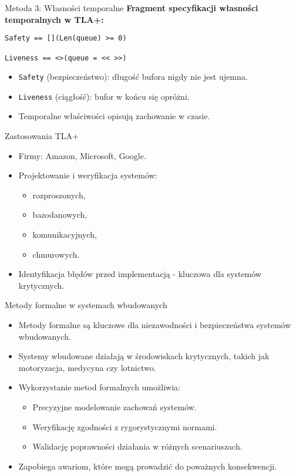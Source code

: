 \documentclass{beamer}
\begin{document}
\begin{frame}[fragile]{Metoda 3: Własności temporalne}
  \textbf{Fragment specyfikacji własności temporalnych w TLA+:}
  \vspace{0.5em}
  \begin{verbatim}
Safety == [](Len(queue) >= 0)

Liveness == <>(queue = << >>)
  \end{verbatim}

  \vspace{0.1em}
  \begin{itemize}
    \item \texttt{Safety} (bezpieczeństwo): długość bufora nigdy nie jest ujemna.
    \item \texttt{Liveness} (ciągłość): bufor w końcu się opróżni.
    \item Temporalne właściwości opisują zachowanie w czasie.
  \end{itemize}
\end{frame}

\begin{frame}{Zastosowania TLA+}
  \begin{itemize}
      \item Firmy: Amazon, Microsoft, Google.
      \item Projektowanie i weryfikacja systemów:
      \begin{itemize}
          \item rozproszonych,
          \item bazodanowych,
          \item komunikacyjnych,
          \item chmurowych.
      \end{itemize}
      \item Identyfikacja błędów przed implementacją - kluczowa dla systemów krytycznych.
  \end{itemize}
\end{frame}

\begin{frame}{Metody formalne w systemach wbudowanych}
  \begin{itemize}
    \item Metody formalne są kluczowe dla niezawodności i bezpieczeństwa systemów wbudowanych.
    \item Systemy wbudowane działają w środowiskach krytycznych, takich jak motoryzacja, medycyna czy lotnictwo.
    \item Wykorzystanie metod formalnych umożliwia:
      \begin{itemize}
        \item Precyzyjne modelowanie zachowań systemów.
        \item Weryfikację zgodności z rygorystycznymi normami.
        \item Walidację poprawności działania w różnych scenariuszach.
      \end{itemize}
    \item Zapobiega awariom, które mogą prowadzić do poważnych konsekwencji.
  \end{itemize}
\end{frame}
\end{document}
